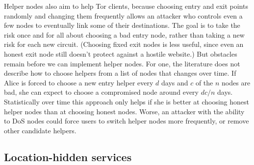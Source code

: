 \documentclass{llncs}
\begin{document}
Helper nodes also aim to help Tor clients, because choosing entry and exit
points
randomly and changing them frequently allows an attacker who controls
even a few nodes to eventually link some of their destinations. The goal
is to take the risk once and for all about choosing a bad entry node,
rather than taking a new risk for each new circuit. (Choosing fixed
exit nodes is less useful, since even an honest exit node still doesn't
protect against a hostile website.) But obstacles remain before
we can implement helper nodes.
For one, the literature does not describe how to choose helpers from a list
of nodes that changes over time.  If Alice is forced to choose a new entry
helper every $d$ days and $c$ of the $n$ nodes are bad, she can expect
to choose a compromised node around
every $dc/n$ days. Statistically over time this approach only helps
if she is better at choosing honest helper nodes than at choosing
honest nodes.  Worse, an attacker with the ability to DoS nodes could
force users to switch helper nodes more frequently, or remove
other candidate helpers.


%
%


\subsection{Location-hidden services}
\label{subsec:hidden-services}
\end{document}
